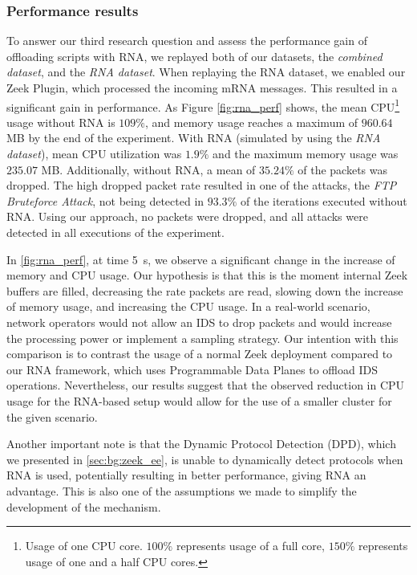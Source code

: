 \subsubsection*{Performance results}

To answer our third research question and assess the performance gain of offloading scripts with RNA, we replayed both of our datasets, the \textit{combined dataset}, and the \textit{RNA dataset}. When replaying the RNA dataset, we enabled our Zeek Plugin, which processed the incoming mRNA messages. This resulted in a significant gain in performance. As Figure \ref{fig:rna_perf} shows, the mean CPU\footnote{Usage of one CPU core. $100\%$ represents usage of a full core, $150\%$ represents usage of one and a half CPU cores.} usage without RNA is $109\%$, and memory usage reaches a maximum of $960.64$ MB by the end of the experiment. With RNA (simulated by using the \textit{RNA dataset}), mean CPU utilization was $1.9\%$ and the maximum memory usage was $235.07$ MB. Additionally, without RNA, a mean of $35.24\%$ of the packets was dropped. The high dropped packet rate resulted in one of the attacks, the \textit{FTP Bruteforce Attack}, not being detected in $93.3\%$ of the iterations executed without RNA. Using our approach, no packets were dropped, and all attacks were detected in all executions of the experiment.

In \autoref{fig:rna_perf}, at time \SI{5}{s}, we observe a significant change in the increase of memory and CPU usage. Our hypothesis is that this is the moment internal Zeek buffers are filled, decreasing the rate packets are read, slowing down the increase of memory usage, and increasing the CPU usage. In a real-world scenario, network operators would not allow an IDS to drop packets and would increase the processing power or implement a sampling strategy. Our intention with this comparison is to contrast the usage of a normal Zeek deployment compared to our RNA framework, which uses Programmable Data Planes to offload IDS operations. Nevertheless, our results suggest that the observed reduction in CPU usage for the RNA-based setup would allow for the use of a smaller cluster for the given scenario. 

Another important note is that the Dynamic Protocol Detection (DPD), which we presented in \autoref{sec:bg:zeek_ee}, is unable to dynamically detect protocols when RNA is used, potentially resulting in better performance, giving RNA an advantage. This is also one of the assumptions we made to simplify the development of the mechanism.

